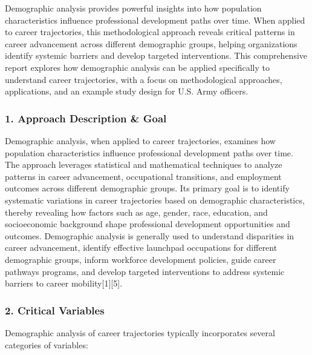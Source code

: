 \documentclass[./main.tex]{subfiles}
\begin{document}
Demographic analysis provides powerful insights into how population
characteristics influence professional development paths over time. When
applied to career trajectories, this methodological approach reveals
critical patterns in career advancement across different demographic
groups, helping organizations identify systemic barriers and develop
targeted interventions. This comprehensive report explores how
demographic analysis can be applied specifically to understand career
trajectories, with a focus on methodological approaches, applications,
and an example study design for U.S. Army officers.

\subsubsection{1. Approach Description \&
Goal}\label{approach-description-goal}

Demographic analysis, when applied to career trajectories, examines how
population characteristics influence professional development paths over
time. The approach leverages statistical and mathematical techniques to
analyze patterns in career advancement, occupational transitions, and
employment outcomes across different demographic groups. Its primary
goal is to identify systematic variations in career trajectories based
on demographic characteristics, thereby revealing how factors such as
age, gender, race, education, and socioeconomic background shape
professional development opportunities and outcomes. Demographic
analysis is generally used to understand disparities in career
advancement, identify effective launchpad occupations for different
demographic groups, inform workforce development policies, guide career
pathways programs, and develop targeted interventions to address
systemic barriers to career mobility{[}1{]}{[}5{]}.

\subsubsection{2. Critical Variables}\label{critical-variables}

Demographic analysis of career trajectories typically incorporates
several categories of variables:
\end{document}
